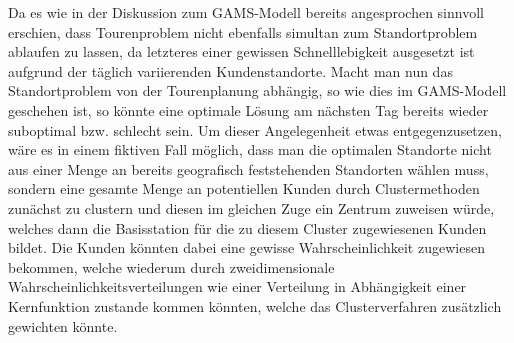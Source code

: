 \documentclass[a4paper,12pt,parskip,bibtotoc,liststotoc]{article}
\begin{document}
Da es wie in der Diskussion zum GAMS-Modell bereits angesprochen sinnvoll erschien, dass Tourenproblem nicht ebenfalls simultan zum Standortproblem ablaufen zu lassen, da letzteres einer gewissen Schnelllebigkeit ausgesetzt ist aufgrund der täglich variierenden Kundenstandorte.
Macht man nun das Standortproblem von der Tourenplanung abhängig, so wie dies im GAMS-Modell geschehen ist, so könnte eine optimale Lösung am nächsten Tag bereits wieder suboptimal bzw. schlecht sein.
Um dieser Angelegenheit etwas entgegenzusetzen, wäre es in einem fiktiven Fall möglich, dass man die optimalen Standorte nicht aus einer Menge an bereits geografisch feststehenden Standorten wählen muss, sondern eine gesamte Menge an potentiellen Kunden durch Clustermethoden zunächst zu clustern und diesen im gleichen Zuge ein Zentrum zuweisen würde, welches dann die Basisstation für die zu diesem Cluster zugewiesenen Kunden bildet.
Die Kunden könnten dabei eine gewisse Wahrscheinlichkeit zugewiesen bekommen, welche wiederum durch zweidimensionale Wahrscheinlichkeitsverteilungen wie einer Verteilung in Abhängigkeit einer Kernfunktion zustande kommen könnten, welche das Clusterverfahren zusätzlich gewichten könnte.
\end{document}
